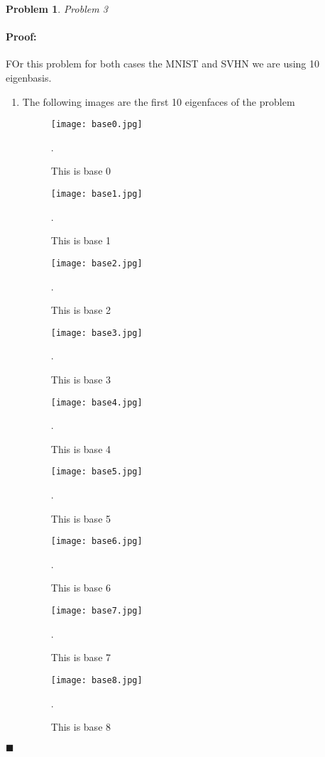 \documentclass[12pt]{article}
\newenvironment{proof}{\paragraph{Proof: }}{\hfill$\blacksquare$}
\newtheorem{problem}{Problem}%
\begin{document}
\begin{problem}
\normalfont
Problem 3
\end{problem}

\begin{proof}
FOr this problem for both cases the MNIST and SVHN we are using 10 eigenbasis.
\begin{enumerate}

\item The following images are the first 10 eigenfaces of the problem

\begin{figure}[!htbp]
\centering
\texttt{[image: base0.jpg]}
\caption{This is base 0}.
\end{figure}


\begin{figure}[!htbp]
\centering
\texttt{[image: base1.jpg]}
\caption{This is base 1}.
\end{figure}

\begin{figure}[!htbp]
\centering
\texttt{[image: base2.jpg]}
\caption{This is base 2}.
\end{figure}

\begin{figure}[!htbp]
\centering
\texttt{[image: base3.jpg]}
\caption{This is base 3}.
\end{figure}

\begin{figure}[!htbp]
\centering
\texttt{[image: base4.jpg]}
\caption{This is base 4}.
\end{figure}

\begin{figure}[!htbp]
\centering
\texttt{[image: base5.jpg]}
\caption{This is base 5}.
\end{figure}

\begin{figure}[!htbp]
\centering
\texttt{[image: base6.jpg]}
\caption{This is base 6}.
\end{figure}

\begin{figure}[!htbp]
\centering
\texttt{[image: base7.jpg]}
\caption{This is base 7}.
\end{figure}

\begin{figure}[!htbp]
\centering
\texttt{[image: base8.jpg]}
\caption{This is base 8}.
\end{figure}


\end{enumerate}
\end{proof}
\end{document}
